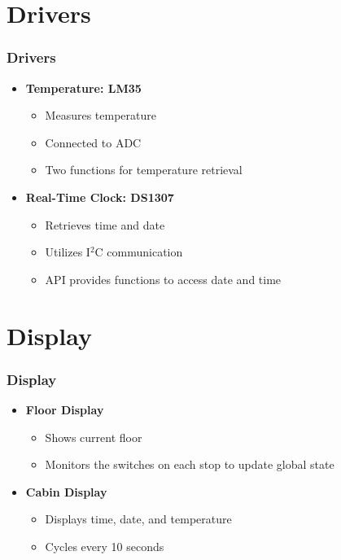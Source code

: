 \documentclass{beamer}
\begin{document}
\section{Drivers}
\begin{frame}
    \frametitle{Drivers}
    \begin{itemize}
        \item \textbf{Temperature: LM35}
              \begin{itemize}
                  \item Measures temperature
                  \item Connected to ADC
                  \item Two functions for temperature retrieval
              \end{itemize}
        \item \textbf{Real-Time Clock: DS1307}
              \begin{itemize}
                  \item Retrieves time and date
                  \item Utilizes I$^2$C communication
                  \item API provides functions to access date and time
              \end{itemize}
    \end{itemize}
\end{frame}

\section{Display}
\begin{frame}
    \frametitle{Display}
    \begin{itemize}
        \item \textbf{Floor Display}
              \begin{itemize}
                  \item Shows current floor
                  \item Monitors the switches on each stop to update global state
              \end{itemize}
        \item \textbf{Cabin Display}
              \begin{itemize}
                  \item Displays time, date, and temperature
                  \item Cycles every 10 seconds
              \end{itemize}
    \end{itemize}
\end{frame}
\end{document}
